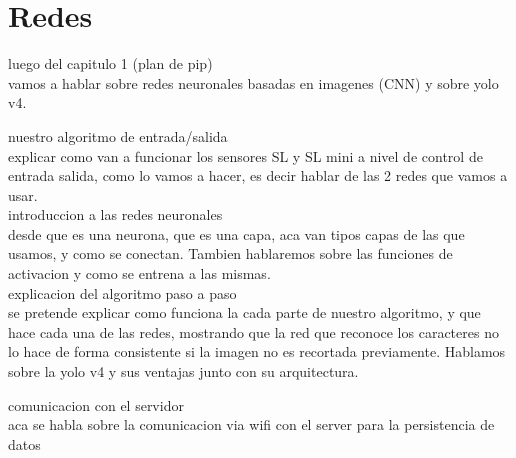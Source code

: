 \section{Redes}

luego del capitulo 1 (plan de pip)\\

vamos a hablar sobre redes neuronales basadas en imagenes (CNN) y sobre yolo v4.

nuestro algoritmo de entrada/salida \\

explicar como van a funcionar los sensores SL y SL mini a nivel de control de entrada salida,
como lo vamos a hacer, es decir hablar de las 2 redes que vamos a usar. \\

introduccion a las redes neuronales \\
desde que es una neurona, que es una capa, aca van tipos capas de las que usamos, y como se conectan. Tambien hablaremos sobre las funciones de activacion y como se entrena a las mismas. \\

explicacion del algoritmo paso a paso \\

se pretende explicar como funciona la cada parte de nuestro algoritmo, y que hace cada una de las redes, mostrando que la red que reconoce los caracteres no lo hace de forma consistente si la imagen no es recortada previamente. Hablamos sobre la yolo v4 y sus ventajas junto con su arquitectura.

comunicacion con el servidor \\

aca se habla sobre la comunicacion via wifi con el server para la persistencia de datos \\